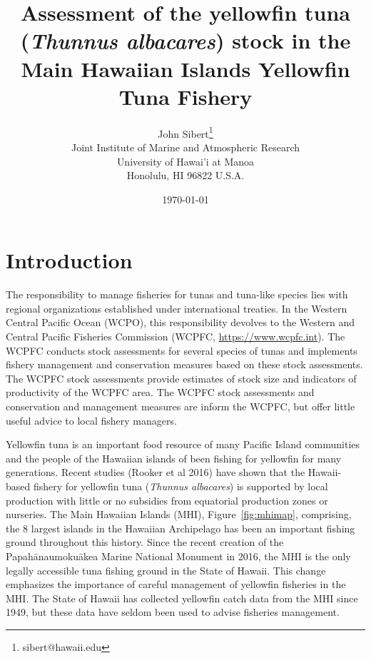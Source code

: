 \documentclass[12pt,letterpaper]{article}
\title{Assessment of the yellowfin tuna ({\it Thunnus albacares}) 
stock in the Main Hawaiian Islands Yellowfin Tuna Fishery}
\author{
John Sibert\thanks{sibert@hawaii.edu}\\
Joint Institute of Marine and Atmospheric Research\\
University of Hawai'i at Manoa\\
Honolulu, HI  96822 U.S.A.\\[0.125in]
\date{\today}
}
\newcommand\doublespacing{\baselineskip=1.6\normalbaselineskip}
\newcommand\help[1]{\color{Magenta}{\it #1}\normalcolor}
\begin{document}
\maketitle


\begin{abstract}
\begin{center}\help{Write me!}\end{center}
\end{abstract}


\section*{Introduction}
The responsibility to manage fisheries for tunas and tuna-like species
lies with regional organizations established under international treaties.
In the Western Central Pacific Ocean (WCPO), this responsibility devolves to
the Western and Central Pacific Fisheries Commission (WCPFC, 
\url{https://www.wcpfc.int}).
The WCPFC conducts stock assessments for several species of tunas and
implements fishery management and conservation measures based on
these stock assessments. The WCPFC stock assessments provide estimates
of stock size and indicators of productivity of the WCPFC area. The
WCPFC stock assessments and conservation and management measures are
inform the WCPFC, but offer little useful advice to local fishery managers.

Yellowfin tuna is an important food resource
of many Pacific Island communities and the people of the Hawaiian
islands of been fishing for yellowfin for many generations. 
Recent studies (Rooker et al 2016) have shown that the Hawaii-based
fishery for yellowfin tuna ({\it Thunnus albacares}) is  supported by
local production with little or no subsidies from equatorial
production zones or nurseries.
The Main Hawaiian Islands (MHI), Figure~\ref{fig:mhimap},
comprising, the 8 largest islands in the Hawaiian Archipelago
has been an important fishing ground throughout this history.
Since the recent creation of the Papah\={a}naumoku\={a}kea Marine National
Monument in 2016, the MHI is the only legally accessible tuna fishing ground
in the State of Hawaii.
This change emphasizes the importance of careful management of yellowfin
fisheries in the MHI.
The State of Hawaii has collected yellowfin catch data from the MHI
since 1949, but these data have seldom been used to advise fisheries
management.
\end{document}
